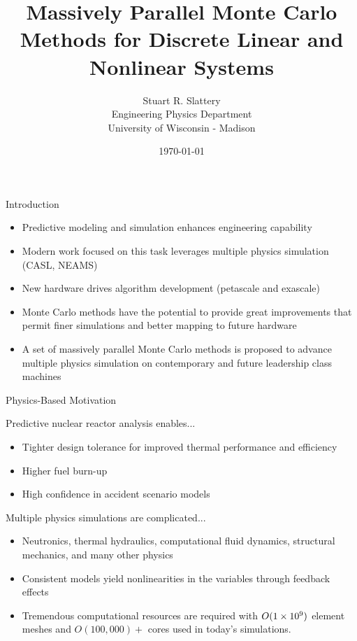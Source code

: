 \documentclass{beamer}
\author{Stuart R. Slattery
  \\ Engineering Physics Department
  \\ University of Wisconsin - Madison
}
\date{\today}
\title{Massively Parallel Monte Carlo Methods for Discrete Linear and
  Nonlinear Systems}
\begin{document}
\maketitle

\begin{frame}{Introduction}

  \begin{itemize}
  \item Predictive modeling and simulation enhances engineering
    capability
  \item Modern work focused on this task leverages multiple physics
    simulation (CASL, NEAMS)
  \item New hardware drives algorithm development (petascale and
    exascale)
  \item Monte Carlo methods have the potential to provide great
    improvements that permit finer simulations and better mapping to
    future hardware
  \item A set of massively parallel Monte Carlo methods is proposed to
    advance multiple physics simulation on contemporary and future
    leadership class machines
  \end{itemize}

\end{frame}

\begin{frame}{Physics-Based Motivation}
  
  \pause
  \begin{beamerboxesrounded}[upper=boxheadcolor,lower=boxbodycolor,shadow=true]
    {Predictive nuclear reactor analysis enables...}
    \begin{itemize}
    \item Tighter design tolerance for improved thermal performance
      and efficiency
    \item Higher fuel burn-up
    \item High confidence in accident scenario models
    \end{itemize}
  \end{beamerboxesrounded}

  \pause
  \begin{beamerboxesrounded}[upper=boxheadcolor,lower=boxbodycolor,shadow=true]
    {Multiple physics simulations are complicated...}
    \begin{itemize}
    \item Neutronics, thermal hydraulics, computational fluid
      dynamics, structural mechanics, and many other physics
    \item Consistent models yield nonlinearities in the variables
      through feedback effects
    \item Tremendous computational resources are required with
      $O(1\times 10^{9})$ element meshes and $O(100,000)+$ cores used in
      today's simulations.
    \end{itemize}
  \end{beamerboxesrounded}

\end{frame}
\end{document}
